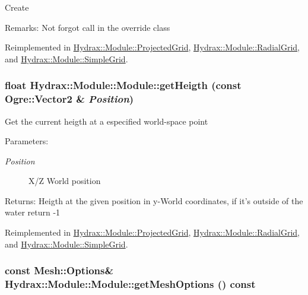 Create \begin{Desc}
\item[Remarks:]Not forgot call in the override class \end{Desc}


Reimplemented in \hyperlink{class_hydrax_1_1_module_1_1_projected_grid_86e4648a741558934e664f7400082742}{Hydrax::Module::ProjectedGrid}, \hyperlink{class_hydrax_1_1_module_1_1_radial_grid_8c0f059e53170e7d1114bb7faecbcb0a}{Hydrax::Module::RadialGrid}, and \hyperlink{class_hydrax_1_1_module_1_1_simple_grid_7e52fb7497f6a2d27666a384d7a1d003}{Hydrax::Module::SimpleGrid}.\hypertarget{class_hydrax_1_1_module_1_1_module_c61f89589d3b1bc7256731ddb7af7d0b}{
\subsubsection[{getHeigth}]{\setlength{\rightskip}{0pt plus 5cm}float Hydrax::Module::Module::getHeigth (const Ogre::Vector2 \& {\em Position})}}
\label{class_hydrax_1_1_module_1_1_module_c61f89589d3b1bc7256731ddb7af7d0b}


Get the current heigth at a especified world-space point \begin{Desc}
\item[Parameters:]
\begin{description}
\item[{\em Position}]X/Z World position \end{description}
\end{Desc}
\begin{Desc}
\item[Returns:]Heigth at the given position in y-World coordinates, if it's outside of the water return -1 \end{Desc}


Reimplemented in \hyperlink{class_hydrax_1_1_module_1_1_projected_grid_a7a5b8100642a55f23b4d1c0a125bd62}{Hydrax::Module::ProjectedGrid}, \hyperlink{class_hydrax_1_1_module_1_1_radial_grid_0289caac51efbaf6a085bbb94eb22c4c}{Hydrax::Module::RadialGrid}, and \hyperlink{class_hydrax_1_1_module_1_1_simple_grid_9a9e5bba632f0317c82370fa433559ac}{Hydrax::Module::SimpleGrid}.\hypertarget{class_hydrax_1_1_module_1_1_module_7e083582d25431f9fbf83ce7eac77a94}{
\subsubsection[{getMeshOptions}]{\setlength{\rightskip}{0pt plus 5cm}const {\bf Mesh::Options}\& Hydrax::Module::Module::getMeshOptions () const}}
\label{class_hydrax_1_1_module_1_1_module_7e083582d25431f9fbf83ce7eac77a94}


